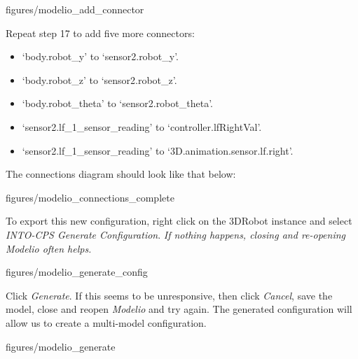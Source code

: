 \documentclass[11pt,a4paper]{../tutorial}
\begin{document}
\begin{instructions}
\begin{annotation}[width=0.55\linewidth,trim=0 400 0 0,clip]{figures/modelio_add_connector}
    \end{annotation}

\newpage

\item Repeat step 17 to add five more connectors:
\begin{itemize}
	\item `body.robot\_y' to `sensor2.robot\_y'.
	\item `body.robot\_z' to `sensor2.robot\_z'.
	\item `body.robot\_theta' to `sensor2.robot\_theta'.
	\item `sensor2.lf\_1\_sensor\_reading' to `controller.lfRightVal'.
	\item `sensor2.lf\_1\_sensor\_reading' to `3D.animation.sensor.lf.right'.
\end{itemize}
The connections diagram should look like that below:

\begin{annotation}[width=0.7\linewidth,trim=0 400 0 0,clip]{figures/modelio_connections_complete}
    \end{annotation}


\item To export this new configuration, right click on the 3DRobot instance and select \emph{INTO-CPS \menusep Generate Configuration}. \emph{If nothing happens, closing and re-opening Modelio often helps.}

    \begin{annotation}[width=0.7\linewidth,trim=290 350 50 400,clip]{figures/modelio_generate_config}
    \end{annotation}

\newpage

\item Click \emph{Generate}. If this seems to be unresponsive, then click \emph{Cancel}, save the model, close and reopen \emph{Modelio} and try again. The generated configuration will allow us to create a multi-model configuration.

    \begin{annotation}[width=0.3\linewidth,trim=0 0 0 0,clip]{figures/modelio_generate}
    \end{annotation}


\end{instructions}
\end{document}
